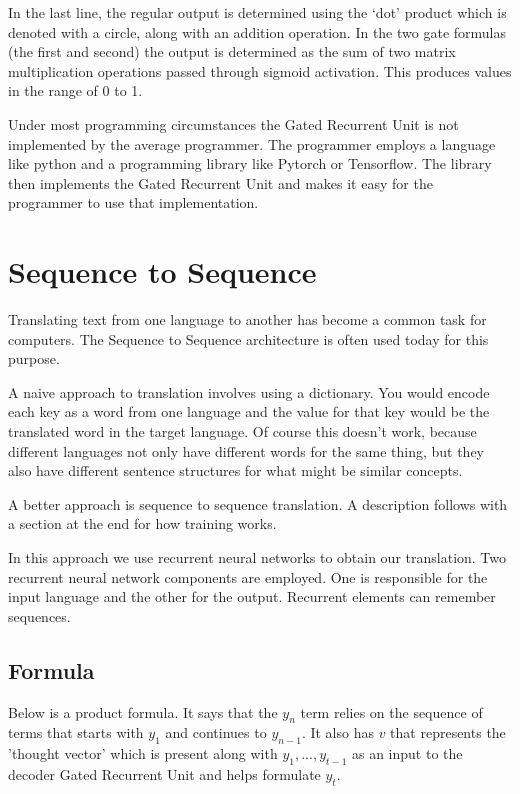 In the last line, the regular output is determined using the `dot' product which is denoted with a circle, along with an addition operation. In the two gate formulas (the first and second) the output is determined as the sum of two matrix multiplication operations passed through sigmoid activation. This produces values in the range of 0 to 1.

Under most programming circumstances the Gated Recurrent Unit is not implemented by the average programmer. The programmer employs a language like python and a programming library like Pytorch or Tensorflow. The library then implements the Gated Recurrent Unit and makes it easy for the programmer to use that implementation.

\section{Sequence to Sequence}

Translating text from one language to another has become a common task for computers. The Sequence to Sequence architecture is often used today for this purpose.

A naive approach to translation involves using a dictionary. You would encode each key as a word from one language and the value for that key would be the translated word in the target language. Of course this doesn't work, because different languages not only have different words for the same thing, but they also have different sentence structures for what might be similar concepts.

A better approach is sequence to sequence translation. A description follows with a section at the end for how training works.

In this approach we use recurrent neural networks to obtain our translation. Two recurrent neural network components are employed. One is responsible for the input language and the other for the output. Recurrent elements can remember sequences. 



\subsection*{Formula}
Below is a product formula. It says that the $y_n$ term relies on the sequence of terms that starts with $y_1$ and continues to $y_{n-1}$. It also has $v$ that represents the 'thought vector' which is present along with $y_1,...,y_{t-1}$ as an input to the decoder Gated Recurrent Unit and helps formulate $y_t$.

